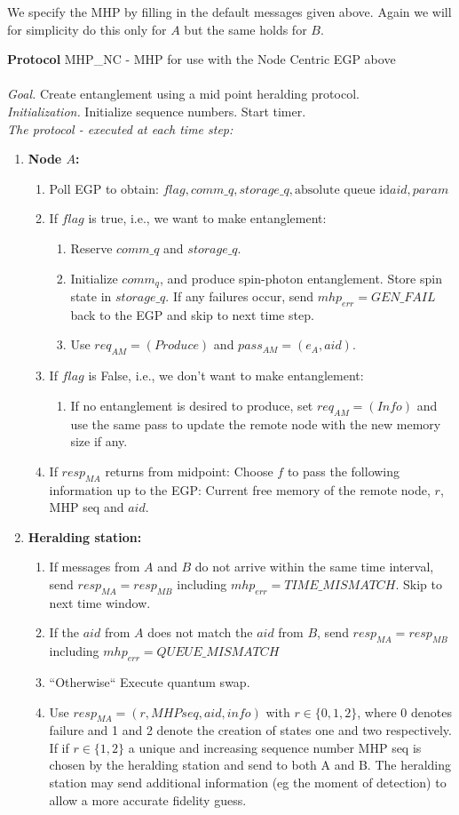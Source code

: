 \documentclass{article}
\makeatletter
\newcounter{Lprotocol}
\newenvironment{Lprotocol}[1]
  {\par\addvspace{\topsep}
   \noindent
   \tabularx{\linewidth}{@{} X @{}}
    \hline
    \refstepcounter{Lprotocol}\textbf{Protocol \theLprotocol} #1 \\
    \hline}
  { \\
    \hline
   \endtabularx
   \par\addvspace{\topsep}}
\newcommand{\sbline}{\\[.5\normalbaselineskip]}%
\makeatother
\begin{document}
We specify the MHP by filling in the default messages given above. Again we will for simplicity do this only for $A$ but the same holds for $B$.
\begin{Lprotocol}{MHP\_NC - MHP for use with the Node Centric EGP above}
\sbline
\textit{Goal.} Create entanglement using a mid point heralding protocol.
\sbline
\textit{Initialization.} Initialize sequence numbers. Start timer.
\sbline
\textit{The protocol - executed at each time step:}
\begin{enumerate}
	\item \textbf{Node $A$:}
	\begin{enumerate}
	\item Poll EGP to obtain: $flag, comm\_q, storage\_q, \mbox{absolute queue id} aid, param$
	\item If $flag$ is true, i.e., we want to make entanglement:
  \begin{enumerate}
	\item Reserve $comm\_q$ and $storage\_q$.
	\item Initialize $comm_q$, and produce spin-photon entanglement. Store spin state in $storage\_q$. If any failures occur, send $mhp_{err} = GEN\_FAIL$ back to the EGP and skip to next time step.
	\item Use $req_{AM} = (Produce)$ and $pass_{AM} = (e_A, aid)$. 
  \end{enumerate}
  \item If $flag$ is False, i.e., we don't want to make entanglement:
  \begin{enumerate}
  \item If no entanglement is desired to produce, set $req_{AM} = (Info)$ and use the same pass to update the remote node with the new memory size if any.
   \end{enumerate}
   \item If $resp_{MA}$ returns from midpoint: 
Choose $f$ to pass the following information up to the EGP: Current free memory of the remote node, $r$, MHP seq and $aid$.
	\end{enumerate}
	\item \textbf{Heralding station:}
	\begin{enumerate}
	\item If messages from $A$ and $B$ do not arrive within the same time interval, send $resp_{MA}=resp_{MB}$ including $mhp_{err} = TIME\_MISMATCH$. Skip to next time window.
	\item If the $aid$ from $A$ does not match the $aid$ from $B$, send $resp_{MA} = resp_{MB}$ including $mhp_{err} = QUEUE\_MISMATCH$
	\item ``Otherwise`` Execute quantum swap.
	\item Use $resp_{MA} = (r, MHP seq, aid, info)$ with $r \in \{0,1,2\}$, where 0 denotes 
failure and 1 and 2 denote the creation of states one and two respectively. If if $r \in \{1,2\}$ a unique and increasing sequence number MHP seq is chosen by the heralding station and send to both A and B. The heralding station may send additional information (eg the moment of detection) to allow a more accurate fidelity guess.
	\end{enumerate}
\end{enumerate}
\end{Lprotocol}
\end{document}
